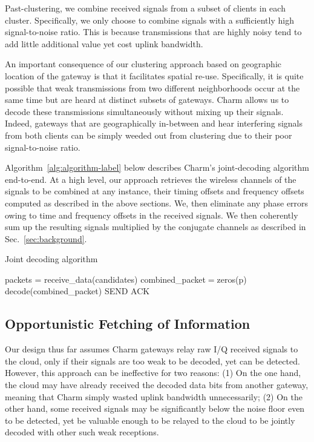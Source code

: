 Past-clustering, we combine received signals from a subset of clients in each
cluster. Specifically, we only choose to combine signals with a sufficiently
high signal-to-noise ratio. This is because transmissions that are highly
noisy tend to add little additional value yet cost uplink bandwidth.

An important consequence of our clustering approach based on geographic
location of the gateway is that it facilitates spatial re-use. Specifically,
it is quite possible that weak transmissions from two different neighborhoods
occur at the same time but are heard at distinct subsets of gateways. Charm
allows us to decode these transmissions simultaneously without mixing up their
signals. Indeed, gateways that are geographically in-between and hear
interfering signals from both clients can be simply weeded out from clustering
due to their poor signal-to-noise ratio.

 Algorithm~\ref{alg:algorithm-label}
below describes Charm's joint-decoding algorithm end-to-end. At a high level,
our approach retrieves the wireless channels of the signals to be combined at
any instance, their timing offsets and frequency offsets computed as described
in the above sections. We, then eliminate any phase errors owing to time and
frequency offsets in the received signals. We then coherently sum up the
resulting signals multiplied by the conjugate channels as described in
Sec.~\ref{sec:background}.

\LinesNumbered
\begin{algorithm}[ht]
\caption{Joint decoding algorithm}
\label{alg:algorithm-label}
 packets = receive\_data(candidates)\;
 combined\_packet$=$zeros(p)\;
 decode(combined\_packet)\;
 SEND ACK\;
 
 \end{algorithm}

\subsection{Opportunistic Fetching of Information}
Our design thus far assumes Charm gateways relay raw I/Q received signals to
the cloud, only if their signals are too weak to be decoded, yet can be
detected. However, this approach can be ineffective for two reasons: (1) On
the one hand, the cloud may have already received the decoded data bits from
another gateway, meaning that Charm simply wasted uplink bandwidth
unnecessarily; (2) On the other hand, some received signals may be
significantly below the noise floor even to be detected, yet be valuable
enough to be relayed to the cloud to be jointly decoded with other such weak
receptions.

